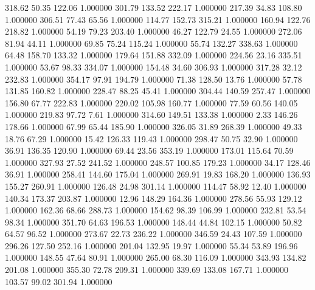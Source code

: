    318.62     50.35    122.06  1.000000
    301.79    133.52    222.17  1.000000
    217.39     34.83    108.80  1.000000
    306.51     77.43     65.56  1.000000
    114.77    152.73    315.21  1.000000
    160.94    122.76    218.82  1.000000
     54.19     79.23    203.40  1.000000
     46.27    122.79     24.55  1.000000
    272.06     81.94     44.11  1.000000
     69.85     75.24    115.24  1.000000
     55.74    132.27    338.63  1.000000
     64.48    158.70    133.32  1.000000
    179.64    151.88    332.09  1.000000
    224.56     23.16    335.51  1.000000
     53.67     98.33    334.07  1.000000
    154.48     34.60    306.93  1.000000
    317.28     32.12    232.83  1.000000
    354.17     97.91    194.79  1.000000
     71.38    128.50     13.76  1.000000
     57.78    131.85    160.82  1.000000
    228.47     88.25     45.41  1.000000
    304.44    140.59    257.47  1.000000
    156.80     67.77    222.83  1.000000
    220.02    105.98    160.77  1.000000
     77.59     60.56    140.05  1.000000
    219.83     97.72      7.61  1.000000
    314.60    149.51    133.38  1.000000
      2.33    146.26    178.66  1.000000
     67.99     65.44    185.90  1.000000
    326.05     31.89    268.39  1.000000
     49.33     18.76     67.29  1.000000
     15.42    126.33    119.43  1.000000
    298.47     50.75     32.90  1.000000
     36.91    136.35    120.90  1.000000
     69.44     23.56    353.19  1.000000
    173.01    115.64     70.59  1.000000
    327.93     27.52    241.52  1.000000
    248.57    100.85    179.23  1.000000
     34.17    128.46     36.91  1.000000
    258.41    144.60    175.04  1.000000
    269.91     19.83    168.20  1.000000
    136.93    155.27    260.91  1.000000
    126.48     24.98    301.14  1.000000
    114.47     58.92     12.40  1.000000
    140.34    173.37    203.87  1.000000
     12.96    148.29    164.36  1.000000
    278.56     55.93    129.12  1.000000
    162.36     68.66    288.73  1.000000
    154.62     98.39    106.99  1.000000
    232.81     53.54     98.34  1.000000
    351.70     64.63    196.53  1.000000
    148.44     44.84    102.15  1.000000
     50.82     64.57     96.52  1.000000
    273.67     22.73    236.22  1.000000
    346.59     24.43    107.59  1.000000
    296.26    127.50    252.16  1.000000
    201.04    132.95     19.97  1.000000
     55.34     53.89    196.96  1.000000
    148.55     47.64     80.91  1.000000
    265.00     68.30    116.09  1.000000
    343.93    134.82    201.08  1.000000
    355.30     72.78    209.31  1.000000
    339.69    133.08    167.71  1.000000
    103.57     99.02    301.94  1.000000
